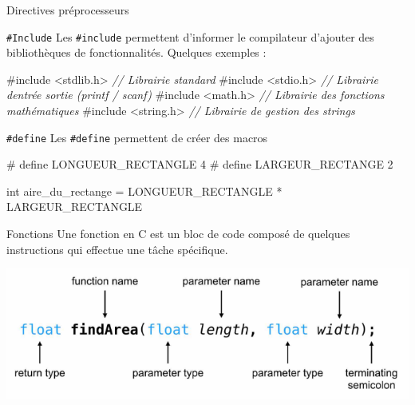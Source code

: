 \documentclass[
  10pt,
  french,
  ignorenonframetext,
  aspectratio=169,
]{beamer}
\newenvironment{Shaded}{}{}
\newcommand{\CommentTok}[1]{\textcolor[rgb]{0.38,0.63,0.69}{\textit{#1}}}
\newcommand{\DataTypeTok}[1]{\textcolor[rgb]{0.56,0.13,0.00}{#1}}
\newcommand{\ImportTok}[1]{#1}
\newcommand{\NormalTok}[1]{#1}
\newcommand{\OperatorTok}[1]{\textcolor[rgb]{0.40,0.40,0.40}{#1}}
\newcommand{\PreprocessorTok}[1]{\textcolor[rgb]{0.74,0.48,0.00}{#1}}
\begin{document}
\begin{frame}[fragile]{Directives préprocesseurs}
\protect\hypertarget{directives-pruxe9processeurs}{}
\begin{block}{\texttt{\#Include}}
\protect\hypertarget{include}{}
Les \texttt{\#include} permettent d'informer le compilateur d'ajouter
des bibliothèques de fonctionnalités. Quelques exemples :

\begin{Shaded}
\begin{Highlighting}[]
\PreprocessorTok{\#include }\ImportTok{\textless{}stdlib.h\textgreater{}}\PreprocessorTok{ }\CommentTok{// Librairie standard}
\PreprocessorTok{\#include }\ImportTok{\textless{}stdio.h\textgreater{}}\PreprocessorTok{  }\CommentTok{// Librairie d\textquotesingle{}entrée sortie (printf / scanf) }
\PreprocessorTok{\#include }\ImportTok{\textless{}math.h\textgreater{}}\PreprocessorTok{   }\CommentTok{// Librairie des fonctions mathématiques}
\PreprocessorTok{\#include }\ImportTok{\textless{}string.h\textgreater{}}\PreprocessorTok{ }\CommentTok{// Librairie de gestion des strings}
\end{Highlighting}
\end{Shaded}
\end{block}

\begin{block}{\texttt{\#define}}
\protect\hypertarget{define}{}
Les \texttt{\#define} permettent de créer des macros

\begin{Shaded}
\begin{Highlighting}[]
\PreprocessorTok{\# define LONGUEUR\_RECTANGLE 4}
\PreprocessorTok{\# define LARGEUR\_RECTANGE 2}

\DataTypeTok{int}\NormalTok{ aire\_du\_rectange }\OperatorTok{=}\NormalTok{ LONGUEUR\_RECTANGLE }\OperatorTok{*}\NormalTok{ LARGEUR\_RECTANGLE}
\end{Highlighting}
\end{Shaded}
\end{block}
\end{frame}

\begin{frame}{Fonctions}
\protect\hypertarget{fonctions}{}
Une fonction en C est un bloc de code composé de quelques instructions
qui effectue une tâche spécifique.

\includegraphics{img/function-declaration.png}
\end{frame}
\end{document}
